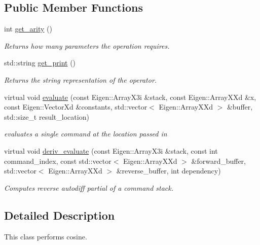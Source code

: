 \subsection*{Public Member Functions}
\begin{DoxyCompactItemize}
\item 
int \hyperlink{classCos_ac2beebc68e2983e2f6f27728c04d32b8}{get\+\_\+arity} ()\hypertarget{classCos_ac2beebc68e2983e2f6f27728c04d32b8}{}\label{classCos_ac2beebc68e2983e2f6f27728c04d32b8}

\begin{DoxyCompactList}\small\item\em Returns how many parameters the operation requires. \end{DoxyCompactList}\item 
std\+::string \hyperlink{classCos_a4db275037edc252704370b203dcc2efb}{get\+\_\+print} ()\hypertarget{classCos_a4db275037edc252704370b203dcc2efb}{}\label{classCos_a4db275037edc252704370b203dcc2efb}

\begin{DoxyCompactList}\small\item\em Returns the string representation of the operator. \end{DoxyCompactList}\item 
virtual void \hyperlink{classCos_a580742a5758d0e31ecfc98c9e49fa597}{evaluate} (const Eigen\+::\+Array\+X3i \&stack, const Eigen\+::\+Array\+X\+Xd \&x, const Eigen\+::\+Vector\+Xd \&constants, std\+::vector$<$ Eigen\+::\+Array\+X\+Xd $>$ \&buffer, std\+::size\+\_\+t result\+\_\+location)
\begin{DoxyCompactList}\small\item\em evaluates a single command at the location passed in \end{DoxyCompactList}\item 
virtual void \hyperlink{classCos_a4ca2ae643db43a16772f9fdbb86c06a6}{deriv\+\_\+evaluate} (const Eigen\+::\+Array\+X3i \&stack, const int command\+\_\+index, const std\+::vector$<$ Eigen\+::\+Array\+X\+Xd $>$ \&forward\+\_\+buffer, std\+::vector$<$ Eigen\+::\+Array\+X\+Xd $>$ \&reverse\+\_\+buffer, int dependency)
\begin{DoxyCompactList}\small\item\em Computes reverse autodiff partial of a command stack. \end{DoxyCompactList}\end{DoxyCompactItemize}


\subsection{Detailed Description}
This class performs cosine. 

